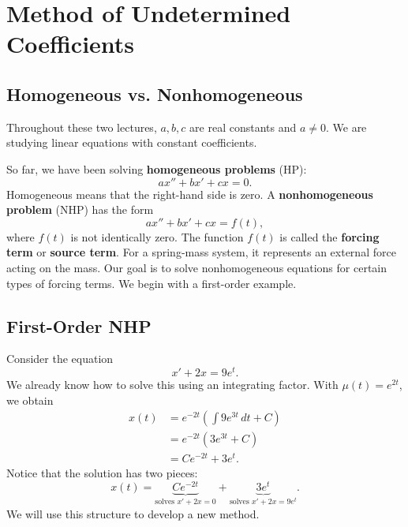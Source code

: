 \documentclass[10pt,letterpaper]{article}
\begin{document}
\renewcommand{\lessontitle}{Undetermined Coefficients, Part 1}
\section{Method of Undetermined Coefficients}

\subsection{Homogeneous vs. Nonhomogeneous}

Throughout these two lectures, $a,b,c$ are real constants and $a\ne0$.
We are studying linear equations with constant coefficients.

So far, we have been solving \textbf{homogeneous problems} (HP):
\begin{equation}
ax''+bx'+cx=0. \tag{HP}
\end{equation}
Homogeneous means that the right-hand side is zero. A
\textbf{nonhomogeneous problem} (NHP) has the form
\begin{equation}
ax''+bx'+cx=f(t), \tag{NHP}
\end{equation}
where $f(t)$ is not identically zero. The function $f(t)$ is
called the \textbf{forcing term} or \textbf{source term}.
For a spring-mass system, it represents an external force
acting on the mass. Our goal is to solve nonhomogeneous equations
for certain types of forcing terms. We begin with a
first-order example.

\subsection{First-Order NHP}

Consider the equation
\[
x'+2x=9e^t.
\]
We already know how to solve this using an integrating factor.
With $\mu(t)=e^{2t}$, we obtain
\begin{align*}
x(t)
&=e^{-2t}\left(\int 9e^{3t}\,dt+C\right)\\
&=e^{-2t}\left(3e^{3t}+C\right)\\
&=Ce^{-2t}+3e^t.
\end{align*}
Notice that the solution has two pieces:
\[
x(t)=
\underbrace{Ce^{-2t}}_{\text{solves }x'+2x=0}
+
\underbrace{3e^t}_{\text{solves }x'+2x=9e^t}.
\]
We will use this structure to develop a new method.
\end{document}
